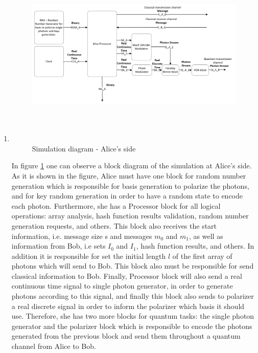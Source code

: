 \begin{enumerate}
  \item

  \begin{figure}[h]
	\centering
	\includegraphics[width=1.1\textwidth, height=9cm]{./sdf/qokd_with_discrete_variables/figures/Simulation_Alice.png}
	\caption{Simulation diagram - Alice's side}\label{simulationalice}
\end{figure}

    In figure \ref{simulationalice} one can observe a block diagram of the simulation at Alice's side. As it is shown in the figure, Alice must have one block for random number generation which is responsible for basis generation to polarize the photons, and for key random generation in order to have a random state to encode each photon. Furthermore, she has a Processor block for all logical operations: array analysis, hash function results validation, random number generation requests, and others. This block also receives the start information, i.e. message size s and messages $m_{0}$ and $m_{1}$, as well as information from Bob, i.e sets $I_{0}$ and $I_{1}$, hash function results, and others. In addition it is responsible for set the initial length $l$ of the first array of photons which will send to Bob. This block also must be responsible for send classical information to Bob. Finally, Processor block will also send a real continuous time signal to single photon generator, in order to generate photons according to this signal, and finally this block also sends to polarizer a real discrete signal in order to inform the polarizer which basis it should use. Therefore, she has two more blocks for quantum tasks: the single photon generator and the polarizer block which is responsible to encode the photons generated from the previous block and send them throughout a quantum channel from Alice to Bob.


\end{enumerate}
